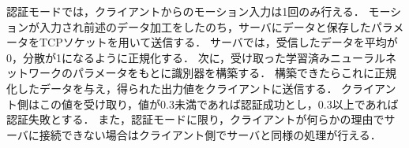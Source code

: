 認証モードでは，クライアントからのモーション入力は1回のみ行える．
モーションが入力され前述のデータ加工をしたのち，サーバにデータと保存したパラメータをTCPソケットを用いて送信する．
サーバでは，受信したデータを平均が0，分散が1になるように正規化する．
次に，受け取った学習済みニューラルネットワークのパラメータをもとに識別器を構築する．
構築できたらこれに正規化したデータを与え，得られた出力値をクライアントに送信する．
クライアント側はこの値を受け取り，値が0.3未満であれば認証成功とし，0.3以上であれば認証失敗とする．
また，認証モードに限り，クライアントが何らかの理由でサーバに接続できない場合はクライアント側でサーバと同様の処理が行える．

